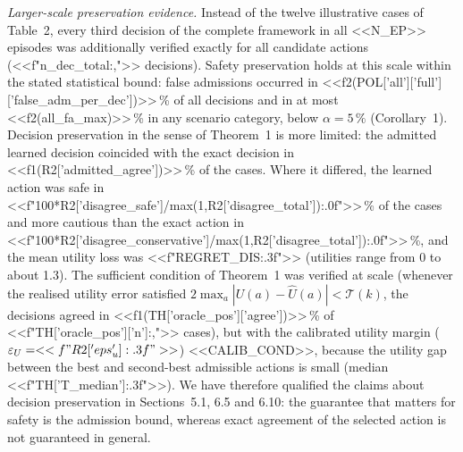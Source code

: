 \documentclass[11pt]{article}
\begin{document}
\emph{Larger-scale preservation evidence.} Instead of the twelve illustrative cases of Table~2, every third decision of the
complete framework in all <<N_EP>> episodes was additionally verified exactly for all candidate actions
(<<f"{n_dec_total:,}">> decisions). Safety preservation holds at this scale within the stated statistical bound: false admissions
occurred in <<f2(POL['all']['full']['false_adm_per_dec'])>>\,\% of all decisions and in at most <<f2(all_fa_max)>>\,\% in any
scenario category, below $\alpha=5\,\%$ (Corollary~1). Decision preservation in the sense of Theorem~1 is more limited: the admitted
learned decision coincided with the exact decision in <<f1(R2['admitted_agree'])>>\,\% of the cases. Where it differed, the
learned action was safe in <<f"{100*R2['disagree_safe']/max(1,R2['disagree_total']):.0f}">>\,\% of the cases and more cautious than the
exact action in <<f"{100*R2['disagree_conservative']/max(1,R2['disagree_total']):.0f}">>\,\%, and the mean utility loss was
<<f"{REGRET_DIS:.3f}">> (utilities range from 0 to about 1.3). The sufficient condition of Theorem~1 was
verified at scale (whenever the realised utility error satisfied $2\max_a|U(a)-\hat U(a)|<\mathcal{T}(k)$, the decisions agreed in
<<f1(TH['oracle_pos']['agree'])>>\,\% of <<f"{TH['oracle_pos']['n']:,}">> cases), but with the calibrated utility margin
($\varepsilon_U=<<f"{R2['eps_u']:.3f}">>$) <<CALIB_COND>>, because the utility gap between the best and second-best admissible actions is small (median <<f"{TH['T_median']:.3f}">>).
We have therefore qualified the claims about decision preservation in Sections~5.1, 6.5 and 6.10: the guarantee that matters for
safety is the admission bound, whereas exact agreement of the selected action is not guaranteed in general.
\end{document}
